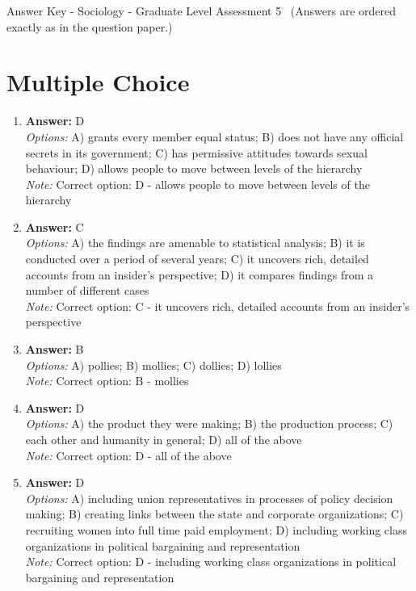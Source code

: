 \documentclass[12pt]{article}
\begin{document}
\begin{center}
Answer Key - Sociology - Graduate Level Assessment 5 \
\small (Answers are ordered exactly as in the question paper.)
\end{center}

\section*{Multiple Choice}
\begin{enumerate}[label=\arabic*.]
\item \textbf{Answer:} D
\\ \textit{Options:} A) grants every member equal status; B) does not have any official secrets in its government; C) has permissive attitudes towards sexual behaviour; D) allows people to move between levels of the hierarchy
\\ \textit{Note:} Correct option: D - allows people to move between levels of the hierarchy
\item \textbf{Answer:} C
\\ \textit{Options:} A) the findings are amenable to statistical analysis; B) it is conducted over a period of several years; C) it uncovers rich, detailed accounts from an insider's perspective; D) it compares findings from a number of different cases
\\ \textit{Note:} Correct option: C - it uncovers rich, detailed accounts from an insider's perspective
\item \textbf{Answer:} B
\\ \textit{Options:} A) pollies; B) mollies; C) dollies; D) lollies
\\ \textit{Note:} Correct option: B - mollies
\item \textbf{Answer:} D
\\ \textit{Options:} A) the product they were making; B) the production process; C) each other and humanity in general; D) all of the above
\\ \textit{Note:} Correct option: D - all of the above
\item \textbf{Answer:} D
\\ \textit{Options:} A) including union representatives in processes of policy decision making; B) creating links between the state and corporate organizations; C) recruiting women into full time paid employment; D) including working class organizations in political bargaining and representation
\\ \textit{Note:} Correct option: D - including working class organizations in political bargaining and representation
\end{enumerate}
\end{document}
